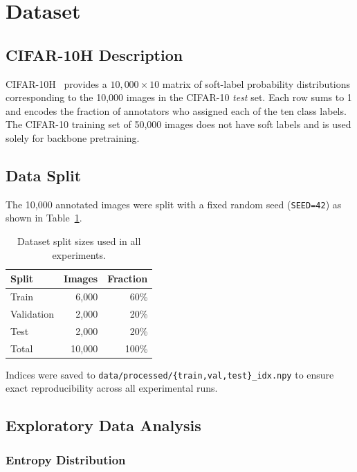 \documentclass[11pt,a4paper]{article}
\begin{document}
\section{Dataset}

\subsection{CIFAR-10H Description}

CIFAR-10H~\cite{peterson2019human} provides a $10{,}000 \times 10$ matrix of
soft-label probability distributions corresponding to the 10,000 images in
the CIFAR-10 \emph{test} set.
Each row sums to 1 and encodes the fraction of annotators who assigned each
of the ten class labels.
The CIFAR-10 training set of 50,000 images does not have soft labels and is
used solely for backbone pretraining.

\subsection{Data Split}

The 10,000 annotated images were split with a fixed random seed
(\texttt{SEED=42}) as shown in Table~\ref{tab:splits}.

\begin{table}[H]
\centering
\caption{Dataset split sizes used in all experiments.}
\label{tab:splits}
\begin{tabular}{lrr}
\toprule
\textbf{Split} & \textbf{Images} & \textbf{Fraction} \\
\midrule
Train      & 6{,}000 & 60\% \\
Validation & 2{,}000 & 20\% \\
Test       & 2{,}000 & 20\% \\
\midrule
Total      & 10{,}000 & 100\% \\
\bottomrule
\end{tabular}
\end{table}

Indices were saved to \texttt{data/processed/\{train,val,test\}\_idx.npy} to
ensure exact reproducibility across all experimental runs.

\subsection{Exploratory Data Analysis}

\subsubsection{Entropy Distribution}
\end{document}

